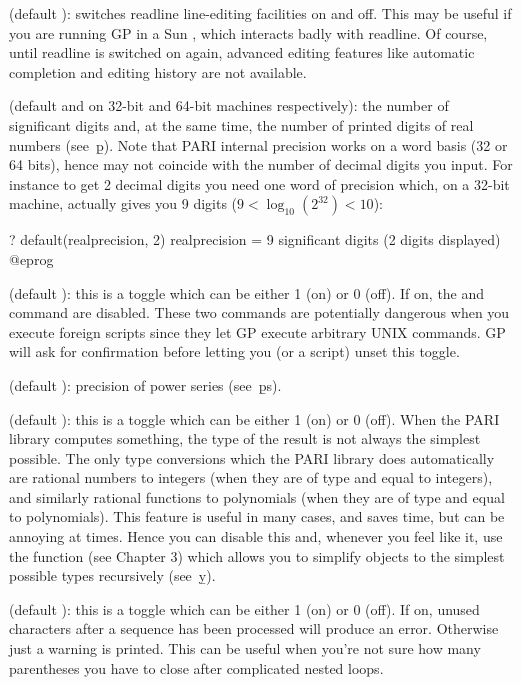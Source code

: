  (default ): switches readline line-editing
facilities on and off. This may be useful if you are running GP in a Sun
, which interacts badly with readline. Of course, until readline
is switched on again, advanced editing features like automatic completion
and editing history are not available.

 (default  and  on 32-bit and 64-bit machines respectively): the number of significant digits and, at the same
time, the number of printed digits of real numbers (see~\b{p}). Note that
PARI internal precision works on a word basis (32 or 64 bits), hence may not
coincide with the number of decimal digits you input. For instance to get 2
decimal digits you need one word of precision which, on a 32-bit machine,
actually gives you 9 digits ($9 < \log_{10}(2^{32}) < 10$):

\bprog
? default(realprecision, 2)
      realprecision = 9 significant digits (2 digits displayed)
@eprog

 (default ): this is a toggle which can be either 1
(on) or 0 (off). If on, the  and  command are
disabled. These two commands are potentially dangerous when you execute
foreign scripts since they let GP execute arbitrary UNIX commands. GP will
ask for confirmation before letting you (or a script) unset this toggle.

 (default ): precision of power series
(see~\b{ps}).

 (default ): this is a toggle which can be either
1 (on) or 0 (off). When the PARI library computes something, the type of the
result is not always the simplest possible. The only type conversions which
the PARI library does automatically are rational numbers to integers (when
they are of type  and equal to integers), and similarly rational
functions to polynomials (when they are of type  and equal to
polynomials). This feature is useful in many cases, and saves time, but can
be annoying at times. Hence you can disable this and, whenever you feel like
it, use the function  (see Chapter 3) which allows you to
simplify objects to the simplest possible types recursively (see~\b{y}).

 (default ): this is a toggle which can be
either 1 (on) or 0 (off). If on, unused characters after a sequence has been
processed will produce an error. Otherwise just a warning is printed. This
can be useful when you're not sure how many parentheses you have to close after
complicated nested loops.

